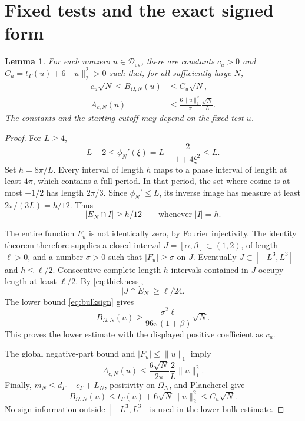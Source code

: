 \documentclass[11pt]{article}
\newtheorem{lemma}[theorem]{Lemma}
\theoremstyle{remark}
\newcommand{\norm}[1]{\lVert #1\rVert}
\newcommand{\core}{\mathcal D_{\mathrm{ev}}}
\numberwithin{equation}{section}
\begin{document}
\section{Fixed tests and the exact signed form}\label{sec:fixed}
\begin{lemma}\label{lem:fixedbounds}
For each nonzero $u\in\core$, there are constants $c_u>0$ and
$C_u=t_\Gamma(u)+6\norm{u}_2^2>0$ such that, for all sufficiently large $N$,
\begin{align}
 c_u\sqrt N\le B_{\Omega,N}(u)&\le C_u\sqrt N,\label{eq:bulkfixed}\\
 A_{c,N}(u)&\le\frac{6\norm{u}_1^2}{\pi}\frac{\sqrt N}{L}.\label{eq:centralupper}
\end{align}
The constants and the starting cutoff may depend on the fixed test $u$.
\end{lemma}
\begin{proof}
For $L\ge4$,
\[
 L-2\le\phi_N'(\xi)=L-\frac2{1+4\xi^2}\le L.
\]
Set $h=8\pi/L$. Every interval of length $h$ maps to a phase interval of length at least $4\pi$, which contains a full period. In that period, the set where cosine is at most $-1/2$ has length $2\pi/3$. Since $\phi_N'\le L$, its inverse image has measure at least $2\pi/(3L)=h/12$. Thus
\begin{equation}\label{eq:thickness}
 |E_N\cap I|\ge h/12\qquad\text{whenever }|I|=h.
\end{equation}

The entire function $F_u$ is not identically zero, by Fourier injectivity. The identity theorem therefore supplies a closed interval
$J=[\alpha,\beta]\subset(1,2)$, of length $\ell>0$, and a number $\sigma>0$ such that $|F_u|\ge\sigma$ on $J$. Eventually $J\subset[-L^3,L^3]$ and $h\le\ell/2$. Consecutive complete length-$h$ intervals contained in $J$ occupy length at least $\ell/2$. By \eqref{eq:thickness},
\[
 |J\cap E_N|\ge\ell/24.
\]
The lower bound \eqref{eq:bulksign} gives
\begin{equation}\label{eq:cu}
 B_{\Omega,N}(u)\ge
 \frac{\sigma^2\ell}{96\pi(1+\beta)}\sqrt N.
\end{equation}
This proves the lower estimate with the displayed positive coefficient as $c_u$.

The global negative-part bound and $|F_u|\le\norm{u}_1$ imply
\[
 A_{c,N}(u)\le\frac{6\sqrt N}{2\pi}\frac2L\norm{u}_1^2.
\]
Finally, $m_N\le d_\Gamma+c_\Gamma+L_N$, positivity on $\Omega_N$, and Plancherel give
\[
 B_{\Omega,N}(u)\le t_\Gamma(u)+6\sqrt N\norm{u}_2^2
 \le C_u\sqrt N.
\]
No sign information outside $[-L^3,L^3]$ is used in the lower bulk estimate.
\end{proof}
\end{document}
